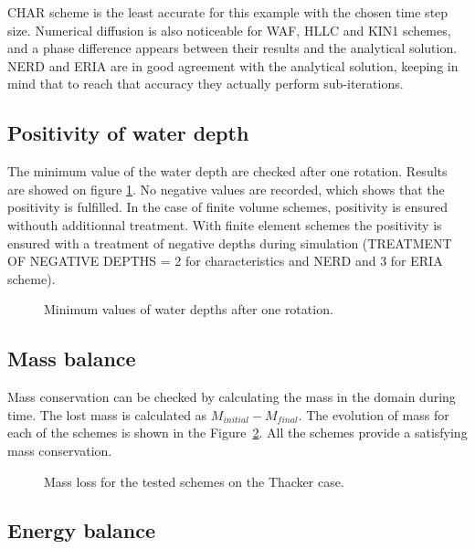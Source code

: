 CHAR scheme is the least accurate for this example with the chosen time step size.
Numerical diffusion is also noticeable for WAF, HLLC and KIN1 schemes, and a phase difference appears between their results and the analytical solution.
NERD and ERIA are in good agreement with the analytical solution, keeping in mind that to reach that accuracy they actually perform sub-iterations.

\subsection{Positivity of water depth}

The minimum value of the water depth are checked after one rotation.
Results are showed on figure \ref{t2d:thacker:minmax}.
No negative values are recorded, which shows that the positivity is fulfilled.
In the case of finite volume schemes, positivity is ensured withouth additionnal treatment.
With finite element schemes the positivity is ensured with a treatment of negative depths
during simulation (TREATMENT OF NEGATIVE DEPTHS = 2 for characteristics and NERD and 3 for ERIA scheme).

\begin{figure}[H]
\centering
{}
\caption{Minimum values of water depths after one rotation.}
\label{t2d:thacker:minmax}
\end{figure}

\subsection{Mass balance}

Mass conservation can be checked by calculating the mass in the domain during time.
The lost mass is calculated as $M_{initial} - M_{final}$.
The evolution of mass for each of the schemes is shown in the Figure~\ref{fig:thacker:VoLTime}.
All the schemes provide a satisfying mass conservation.

\begin{figure}[H]
\centering
  \caption{Mass loss for the tested schemes on the Thacker case.}
\label{fig:thacker:VoLTime}
\end{figure}

\subsection{Energy balance}

